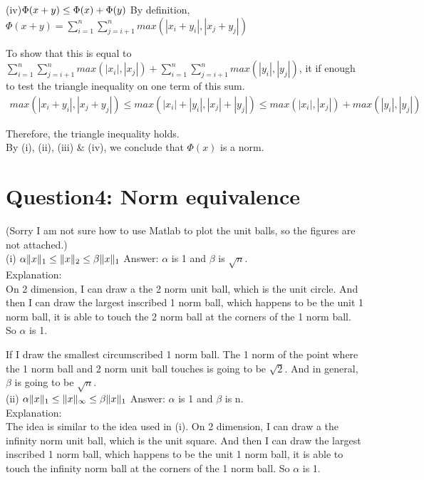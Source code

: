 \documentclass[paper=a4, fontsize=11pt]{scrartcl} %
\numberwithin{equation}{section} %
\numberwithin{figure}{section} %
\numberwithin{table}{section} %
\begin{document}
(iv)$\Phi(x + y) \leq \Phi(x) + \Phi(y)\\ $ 
By definition, $\Phi(x + y) = \displaystyle\sum_{i=1}^{n} \displaystyle\sum_{j=i+1}^{n} max(|x_i + y_i|,|x_j + y_j|)$

To show that this is equal to $\displaystyle\sum_{i=1}^{n} \displaystyle\sum_{j=i+1}^{n} max(|x_i|,|x_j|) + \displaystyle\sum_{i=1}^{n} \displaystyle\sum_{j=i+1}^{n} max(|y_i|,|y_j|) $, it if enough to test the triangle inequality on one term of this sum. 
\begin{equation*} \label{eq1}
\begin{split}
max(|x_i + y_i|,|x_j + y_j|) 
\leq max(|x_i| + |y_i|,|x_j| + |y_j|) 
\leq max(|x_i|,|x_j|) + max(|y_i|,|y_j|)
\end{split}
\end{equation*}

Therefore, the triangle inequality holds.\\

By (i), (ii), (iii) \& (iv), we conclude that $\Phi(x)$ is a norm. 

\newpage
\section*{Question4: Norm equivalence}

(Sorry I am not sure how to use Matlab to plot the unit balls, so the figures are not attached.)\\

(i) $\alpha \|x\|_1 \leq \|x\|_2 \leq \beta \|x\|_1 \\ $
Answer: $\alpha$ is 1 and $\beta$ is $\sqrt{n}$.\\
Explanation: \\ 
On 2 dimension, I can draw a the 2 norm unit ball, which is the unit circle. And then I can draw the largest inscribed 1 norm ball, which happens to be the unit 1 norm ball, it is able to touch the 2 norm ball at the corners of the 1 norm ball. So $\alpha$ is 1. 

If I draw the smallest circumscribed 1 norm ball. The 1 norm of the point where the 1 norm ball and 2 norm unit ball touches is going to be $\sqrt{2}$. And in general, $\beta$ is going to be $\sqrt{n}$. \\


(ii) $\alpha \|x\|_1 \leq \|x\|_{\infty} \leq \beta \|x\|_1 \\ $
Answer: $\alpha$ is 1 and $\beta$ is n.\\
Explanation: \\ 
The idea is similar to the idea used in (i). On 2 dimension, I can draw a the infinity norm unit ball, which is the unit square. And then I can draw the largest inscribed 1 norm ball, which happens to be the unit 1 norm ball, it is able to touch the infinity norm ball at the corners of the 1 norm ball. So $\alpha$ is 1. 
\end{document}
